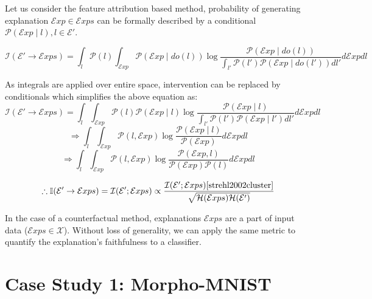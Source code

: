 \documentclass{article}
\begin{document}
Let us consider the feature attribution based method, probability of generating explanation $\mathcal{E}xp \in \mathcal{E}xps$ can be formally described by a conditional $\mathcal{P}(\mathcal{E}xp \mid l), l \in \mathcal{E}'$.

$$\mathcal{I}(\mathcal{E}' \rightarrow \mathcal{E}xps) = \int_l \mathcal{P}(l) \int_{\mathcal{E}xp} \mathcal{P}(\mathcal{E}xp \mid do (l)) \log \frac{\mathcal{P}(\mathcal{E}xp \mid do(l))}{\int_{l'} \mathcal{P}(l') \mathcal{P}(\mathcal{E}xp \mid do(l'))dl'}d\mathcal{E}xp dl$$ 

As integrals are applied over entire space, intervention can be replaced by conditionals which simplifies the above equation as:
$$\mathcal{I}(\mathcal{E}' \rightarrow \mathcal{E}xps) = \int_l \int_{\mathcal{E}xp} \mathcal{P}(l) \mathcal{P}(\mathcal{E}xp \mid l) \log \frac{\mathcal{P}(\mathcal{E}xp \mid l)}{\int_{l'} \mathcal{P}(l') \mathcal{P}(\mathcal{E}xp \mid l')dl'}d\mathcal{E}xp dl$$ 
$$\Rightarrow \int_l \int_{\mathcal{E}xp} \mathcal{P}(l, \mathcal{E}xp) \log \frac{\mathcal{P}(\mathcal{E}xp \mid l)}{\mathcal{P}(\mathcal{E}xp)}d\mathcal{E}xp dl$$ 
$$\Rightarrow \int_l \int_{\mathcal{E}xp} \mathcal{P}(l, \mathcal{E}xp) \log \frac{\mathcal{P}(\mathcal{E}xp, l)}{\mathcal{P}(\mathcal{E}xp)\mathcal{P}(l)}d\mathcal{E}xp dl$$ 

$$\therefore \mathbb{I}(\mathcal{E}' \rightarrow \mathcal{E}xps) = \mathcal{I}(\mathcal{E}'; \mathcal{E}xps) \propto \frac{\mathcal{I}(\mathcal{E}'; \mathcal{E}xps) \cite{strehl2002cluster}}{\sqrt{\mathcal{H}(\mathcal{E}xps)\mathcal{H}(\mathcal{E}')}}$$


In the case of a counterfactual method, explanations $\mathcal{E}xps$ are a part of input data ($\mathcal{E}xps \in \mathcal{X}$). 
Without loss of generality, we can apply the same metric to quantify the explanation's faithfulness to a classifier. 



\section{Case Study 1: Morpho-MNIST}
\label{sec:casestudy1}
\end{document}
